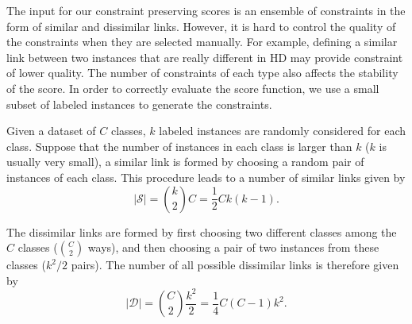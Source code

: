 The input for our constraint preserving scores is an ensemble of constraints in the form of similar and dissimilar links.
However, it is hard to control the quality of the constraints when they are selected manually.
For example, defining a similar link between two instances that are really different in HD may provide constraint of lower quality.
The number of constraints of each type also affects the stability of the score.
In order to correctly evaluate the score function, we use a small subset of labeled instances to generate the constraints.

Given a dataset of $C$ classes, $k$ labeled instances are randomly considered for each class.
Suppose that the number of instances in each class is larger than $k$ ($k$ is usually very small),
a similar link is formed by choosing a random pair of instances of each class.
This procedure leads to a number of similar links given by
\begin{equation}\label{eq:|S|}
    |\mathcal{S}| = {k \choose 2} C = \frac{1}{2} C k (k - 1).
\end{equation}

The dissimilar links are formed by first choosing two different classes among the $C$ classes (${C \choose 2}$ ways),
and then choosing a pair of two instances from these classes ($k^2/2$ pairs).
The number of all possible dissimilar links is therefore given by
\begin{equation}\label{eq:|D|}
    |\mathcal{D}| = {C \choose 2} \frac{k^2}{2} = \frac{1}{4} C (C - 1) k^2.
\end{equation}


